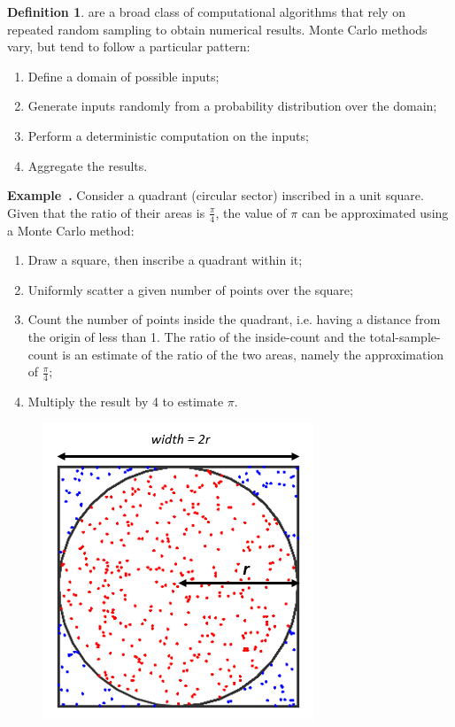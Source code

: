 \documentclass[a4paper]{article}
\theoremstyle{definition}
\newtheorem{definition}{Definition}
\theoremstyle{plain}
\newenvironment{example}[1][]{\refstepcounter{example}\par\medskip
   \noindent \textbf{Example~\theexample. #1} \rmfamily}{\medskip}
\newcounter{example}{Example}
\begin{document}
\begin{definition}
 are a broad class of computational algorithms that rely on repeated random sampling to obtain numerical results. Monte Carlo methods vary, but tend to follow a particular pattern:
\begin{enumerate}
    \item Define a domain of possible inputs;
    \item Generate inputs randomly from a probability distribution over the domain;
    \item Perform a deterministic computation on the inputs;
    \item Aggregate the results.
\end{enumerate}
\end{definition}

\begin{example}
Consider a quadrant (circular sector) inscribed in a unit square. Given that the ratio of their areas is $\frac{\pi}{4}$, the value of $\pi$ can be approximated using a Monte Carlo method:
\begin{enumerate}
    \item Draw a square, then inscribe a quadrant within it;
    \item Uniformly scatter a given number of points over the square;
    \item Count the number of points inside the quadrant, i.e. having a distance from the origin of less than 1. The ratio of the inside-count and the total-sample-count is an estimate of the ratio of the two areas, namely the approximation of $\frac{\pi}{4}$;
    \item Multiply the result by 4 to estimate $\pi$.
\end{enumerate}
\begin{figure}[H]
    \centering
    \includegraphics[scale=0.7]{figure/estimating-pi-monte-carlo-method.png}
\end{figure}
\end{example}
\end{document}
